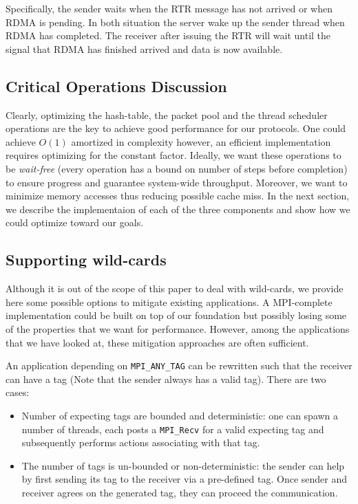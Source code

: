 Specifically, the sender waits when the RTR message has not arrived or when
RDMA is pending. In both situation the server wake up the sender thread when
RDMA has completed. The receiver after issuing the RTR will wait until the
signal that RDMA has finished arrived and data is now available.

\subsection{Critical Operations Discussion}
Clearly, optimizing the hash-table, the packet pool and the thread scheduler
operations are the key to achieve good performance for our protocols. One could
achieve $O(1)$ amortized in complexity however, an efficient implementation
requires optimizing for the constant factor. Ideally, we want these operations
to be \textit{wait-free} (every operation has a bound on number of steps before
completion) to ensure progress and guarantee system-wide throughput. Moreover, we 
want to minimize memory accesses thus reducing possible cache miss. In the next
section, we describe the implementaion of each of the three components and show
how we could optimize toward our goals.

\subsection{Supporting wild-cards}
Although it is out of the scope of this paper to deal with wild-cards, we
provide here some possible options to mitigate existing applications. A
MPI-complete implementation could be built on top of our foundation but
possibly losing some of the properties that we want for performance. However,
among the applications that we have looked at, these mitigation approaches are
often sufficient.

An application depending on \texttt{MPI_ANY_TAG} can be rewritten such
that the receiver can have a tag (Note that the sender always has a valid tag).
There are two cases:
\begin{itemize}
  \item Number of expecting tags are bounded and deterministic: one can spawn a
    number of threads, each posts a \texttt{MPI_Recv} for a valid expecting
    tag and subsequently performs actions associating with that tag. 
  \item The number of tags is un-bounded or non-deterministic: the sender
    can help by first sending its tag to the receiver via a pre-defined tag.
    Once sender and receiver agrees on the generated tag, they can proceed
    the communication.
\end{itemize}

